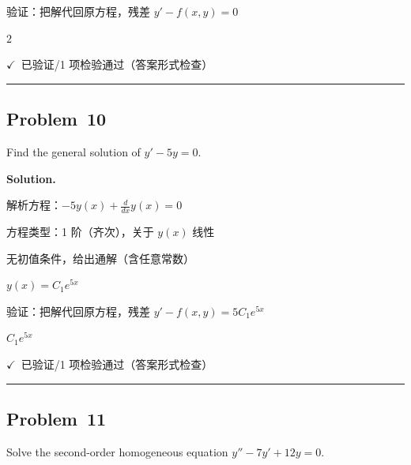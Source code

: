 \documentclass[12pt, a4paper]{article}
\newcommand{\problem}[1]{\subsection*{Problem~#1}}
\newcommand{\solution}{%
  \par\noindent
  {\color{solutiongreen}\bfseries Solution.}\par
}
\newcommand{\verifyok}{\textcolor{solutiongreen}{\ensuremath{\checkmark}\ 已验证}}
\begin{document}
\begin{stepbox}
验证：把解代回原方程，残差 $y' - f(x,y) = 0$
\end{stepbox}

\begin{center}
$\boxed{2}$
\end{center}

\begin{verifybox}\small \verifyok{}/1 项检验通过（答案形式检查） \end{verifybox}

\vspace{0.8em}\hrule\vspace{0.8em}

\problem{10}

\begin{stepbox}
Find the general solution of $y' - 5y = 0$.
\end{stepbox}

\solution

\begin{stepbox}
解析方程：$- 5 y{\left(x \right)} + \frac{d}{d x} y{\left(x \right)} = 0$
\end{stepbox}

\begin{stepbox}
方程类型：1 阶（齐次），关于 $y(x)$ 线性
\end{stepbox}

\begin{stepbox}
无初值条件，给出通解（含任意常数）
\end{stepbox}

\begin{stepbox}
$y(x) = C_{1} e^{5 x}$
\end{stepbox}

\begin{stepbox}
验证：把解代回原方程，残差 $y' - f(x,y) = 5 C_{1} e^{5 x}$
\end{stepbox}

\begin{center}
$\boxed{C_{1} e^{5 x}}$
\end{center}

\begin{verifybox}\small \verifyok{}/1 项检验通过（答案形式检查） \end{verifybox}

\vspace{0.8em}\hrule\vspace{0.8em}

\problem{11}

\begin{stepbox}
Solve the second-order homogeneous equation $y'' - 7y' + 12y = 0$.
\end{stepbox}
\end{document}
